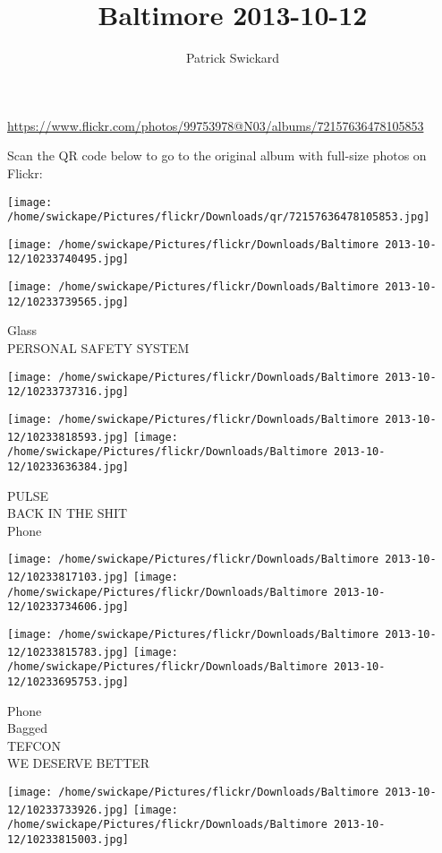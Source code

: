 \documentclass[10pt,letterpaper]{article}
\title{Baltimore 2013-10-12}
\author{Patrick Swickard}
\date{}
\begin{document}
\maketitle

\url{https://www.flickr.com/photos/99753978@N03/albums/72157636478105853}

Scan the QR code below to go to the original album with full-size photos on Flickr:

\texttt{[image: /home/swickape/Pictures/flickr/Downloads/qr/72157636478105853.jpg]}
\pagebreak

\texttt{[image: /home/swickape/Pictures/flickr/Downloads/Baltimore 2013-10-12/10233740495.jpg]}

\vspace{0.25in}
\texttt{[image: /home/swickape/Pictures/flickr/Downloads/Baltimore 2013-10-12/10233739565.jpg]}

Glass\\
PERSONAL SAFETY SYSTEM
\pagebreak

\texttt{[image: /home/swickape/Pictures/flickr/Downloads/Baltimore 2013-10-12/10233737316.jpg]}

\vspace{0.25in}
\texttt{[image: /home/swickape/Pictures/flickr/Downloads/Baltimore 2013-10-12/10233818593.jpg]}
\texttt{[image: /home/swickape/Pictures/flickr/Downloads/Baltimore 2013-10-12/10233636384.jpg]}

PULSE\\
BACK IN THE SHIT\\
Phone
\pagebreak

\texttt{[image: /home/swickape/Pictures/flickr/Downloads/Baltimore 2013-10-12/10233817103.jpg]}
\texttt{[image: /home/swickape/Pictures/flickr/Downloads/Baltimore 2013-10-12/10233734606.jpg]}

\texttt{[image: /home/swickape/Pictures/flickr/Downloads/Baltimore 2013-10-12/10233815783.jpg]}
\texttt{[image: /home/swickape/Pictures/flickr/Downloads/Baltimore 2013-10-12/10233695753.jpg]}

Phone\\
Bagged\\
TEFCON\\
WE DESERVE BETTER
\pagebreak

\texttt{[image: /home/swickape/Pictures/flickr/Downloads/Baltimore 2013-10-12/10233733926.jpg]}
\texttt{[image: /home/swickape/Pictures/flickr/Downloads/Baltimore 2013-10-12/10233815003.jpg]}
\end{document}
